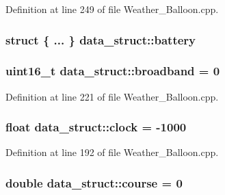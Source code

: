 Definition at line 249 of file Weather\+\_\+\+Balloon.\+cpp.

\subsubsection[{\texorpdfstring{battery}{battery}}]{\setlength{\rightskip}{0pt plus 5cm}struct \{ ... \}   data\+\_\+struct\+::battery}\hypertarget{structdata__struct_ab563098c74eb5e8c7b3deafc91c30908}{}\label{structdata__struct_ab563098c74eb5e8c7b3deafc91c30908}
\subsubsection[{\texorpdfstring{broadband}{broadband}}]{\setlength{\rightskip}{0pt plus 5cm}uint16\+\_\+t data\+\_\+struct\+::broadband = 0}\hypertarget{structdata__struct_a1a2ad01e2e7999b77a63d839193b84a1}{}\label{structdata__struct_a1a2ad01e2e7999b77a63d839193b84a1}


Definition at line 221 of file Weather\+\_\+\+Balloon.\+cpp.

\subsubsection[{\texorpdfstring{clock}{clock}}]{\setlength{\rightskip}{0pt plus 5cm}float data\+\_\+struct\+::clock = -\/1000}\hypertarget{structdata__struct_ad95ff6e00ca03be5a74e37d831e5530f}{}\label{structdata__struct_ad95ff6e00ca03be5a74e37d831e5530f}


Definition at line 192 of file Weather\+\_\+\+Balloon.\+cpp.

\subsubsection[{\texorpdfstring{course}{course}}]{\setlength{\rightskip}{0pt plus 5cm}double data\+\_\+struct\+::course = 0}\hypertarget{structdata__struct_a1735175f3eee0249be96517fe2d013fb}{}\label{structdata__struct_a1735175f3eee0249be96517fe2d013fb}


